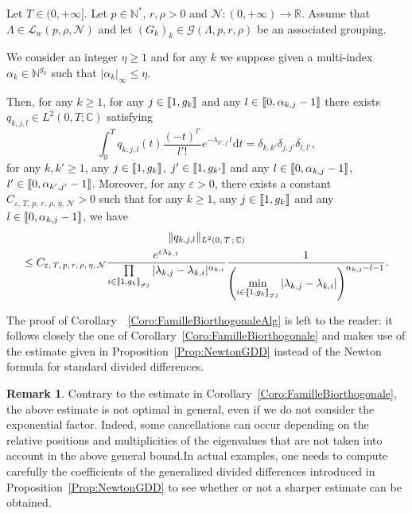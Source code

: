 \documentclass[10pt]{amsart}
\theoremstyle{definition}\newtheorem{defi}[theo]{Definition}\newtheorem{rema}[theo]{Remark}\newtheorem{exam}[theo]{Example}\newtheorem{exem}[theo]{Example}\newtheorem{nota}[theo]{Notation}
\newcommand{\llbracket}{\mathopen{[\mkern -2.7mu[}}
\newcommand{\rrbracket}{\mathclose{]\mkern -2.7mu]}}
\newcommand{\inter}[2]{\llbracket #1,#2 \rrbracket}
\newcommand{\interexclu}[3]{\llbracket #1,#2\rrbracket_{\neq #3}}
\newcommand{\n}{g}
\newcommand{\LL}{\mathcal{L}}
\newcommand{\NN}{\mathcal{N}}
\newcommand{\N}{\mathbb{N}}
\newcommand{\R}{\mathbb{R}}
\newcommand{\C}{\mathbb{C}}
\newcommand{\md}{\mathrm{d}}
\begin{document}
\begin{coro} \label{Coro:FamilleBiorthogonaleAlg}
Let $T \in (0,+\infty]$. Let $p \in \N^*$, $r, \rho > 0$ and $\NN : (0,+\infty) \to \R$. Assume that $\Lambda \in \LL_w(p,\rho, \NN)$ and let $(G_k)_k\in \mathcal{G}(\Lambda,p,r,\rho)$ be an associated grouping.

We consider an integer $\eta \geq 1$ and for any $k$ we suppose given a multi-index $\alpha_k\in \N^{\n_k}$ such that $|\alpha_k|_\infty\leq \eta$.

Then, for any $k \geq 1$, for any $j \in \inter{1}{\n_k}$ and any $l \in \inter{0}{\alpha_{k,j}-1}$ there exists $q_{k,j,l} \in L^2(0,T ; \C)$ satisfying
\begin{equation*}\label{Famille_Biortho_Alg}
\int_0^T q_{k,j,l}(t) \frac{(-t)^{l'}}{l'!} e^{-\lambda_{k',j'} t } \md t = \delta_{k,k'} \delta_{j,j'} \delta_{l,l'},
\end{equation*}
for any $k, k' \geq 1$, any $j \in \inter{1}{\n_{k}}$, $j' \in \inter{1}{\n_{k'}}$ and any $l \in \inter{0}{\alpha_{k,j}-1}$, $l' \in \inter{0}{\alpha_{k',j'}-1}$. Moreover, for any $\varepsilon > 0$, there exists a constant $C_{\varepsilon,\,T,\, p,\, r,\, \rho,\, \eta,\,\NN} >0$ such that for any $k \geq 1$, any $j \in \inter{1}{\n_k}$ and any $l \in \inter{0}{\alpha_{k,j}-1}$, we have
\begin{multline*}\label{Estimee_Famille_Biortho_Alg}
\| q_{k,j,l} \|_{L^2(0,\,T\,;\,\C)} \\ \leq C_{\varepsilon,\,T, \,p,\, r,\, \rho,\, \eta,\, \NN} \frac{e^{\varepsilon \lambda_{k,1}}}{ \prod\limits_{i \in \interexclu{1}{\n_k}{j}} |\lambda_{k,j} - \lambda_{k,i}|^{\alpha_{k,i}}} \frac{1}{\left(\min\limits_{i\in\interexclu{1}{\n_k}{j}} |\lambda_{k,j}-\lambda_{k,i}|\right)^{\alpha_{k,j}-l-1}}.
\end{multline*}
\end{coro}


The proof of Corollary~~\ref{Coro:FamilleBiorthogonaleAlg} is left to the reader: it follows closely the one of Corollary~\ref{Coro:FamilleBiorthogonale} and makes use of the estimate given in Proposition~\ref{Prop:NewtonGDD} instead of the Newton formula for standard divided differences.

\begin{rema}
Contrary to the estimate in Corollary~\ref{Coro:FamilleBiorthogonale}, the above estimate is not optimal in general, even if we do not consider the exponential factor. Indeed, some cancellations can occur depending on the relative positions and multiplicities of the eigenvalues that are not taken into account in the above general bound.\linebreak In actual examples, one needs to compute carefully the coefficients of the generalized divided differences introduced in Proposition~\ref{Prop:NewtonGDD} to see whether or not a sharper estimate can be obtained.
\end{rema}
\end{document}
